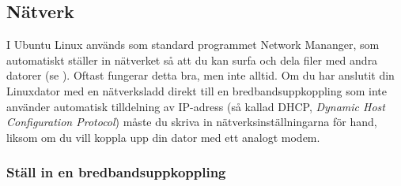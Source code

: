 \documentclass[a4paper,final]{memoir} %
\begin{document}
\subsection{Nätverk}\label{natverksinstallningar}


I Ubuntu Linux används som standard programmet Network Mananger, som automatiskt ställer in nätverket så att du kan surfa och dela filer med andra datorer (se ). Oftast fungerar detta bra, men inte alltid. Om du har anslutit din Linuxdator med en nätverksladd direkt till en bredbandsuppkoppling som inte använder automatisk tilldelning av IP-adress (så kallad DHCP, \textit{Dynamic Host Configuration Protocol}) måste du skriva in nätverksinställningarna för hand, liksom om du vill koppla upp din dator med ett analogt modem. 

\subsubsection{Ställ in en bredbandsuppkoppling}
\end{document}
